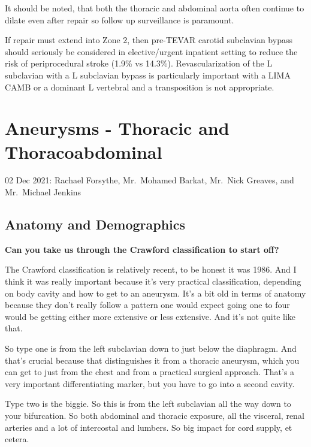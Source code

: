 \documentclass[
]{book}
\begin{document}
It should be noted, that both the thoracic and abdominal aorta often
continue to dilate even after repair so follow up surveillance is
paramount.\citep{famularo2017}

If repair must extend into Zone 2, then pre-TEVAR carotid subclavian
bypass should seriously be considered in elective/urgent inpatient
setting to reduce the risk of periprocedural stroke (1.9\% vs
14.3\%).\citep{bradshaw2017, teixeira2017} Revascularization of the L
subclavian with a L subclavian bypass is particularly important with a
LIMA CAMB or a dominant L vertebral and a transposition is not
appropriate.\citep{morasch2009, matsumura2009}

\hypertarget{aneurysms---thoracic-and-thoracoabdominal}{%
\section{Aneurysms - Thoracic and Thoracoabdominal}\label{aneurysms---thoracic-and-thoracoabdominal}}

02 Dec 2021: Rachael Forsythe, Mr.~Mohamed Barkat, Mr.~Nick Greaves, and
Mr.~Michael Jenkins

\hypertarget{anatomy-and-demographics}{%
\subsection{Anatomy and Demographics}\label{anatomy-and-demographics}}

\textbf{Can you take us through the Crawford classification to start off?}

The Crawford classification is relatively recent, to be honest it was
1986.\citep{crawford1986} And I think it was really important because it's
very practical classification, depending on body cavity and how to get
to an aneurysm. It's a bit old in terms of anatomy because they don't
really follow a pattern one would expect going one to four would be
getting either more extensive or less extensive. And it's not quite like
that.

So type one is from the left subclavian down to just below the
diaphragm. And that's crucial because that distinguishes it from a
thoracic aneurysm, which you can get to just from the chest and from a
practical surgical approach. That's a very important differentiating
marker, but you have to go into a second cavity.

Type two is the biggie. So this is from the left subclavian all the way
down to your bifurcation. So both abdominal and thoracic exposure, all
the visceral, renal arteries and a lot of intercostal and lumbers. So
big impact for cord supply, et cetera.
\end{document}
